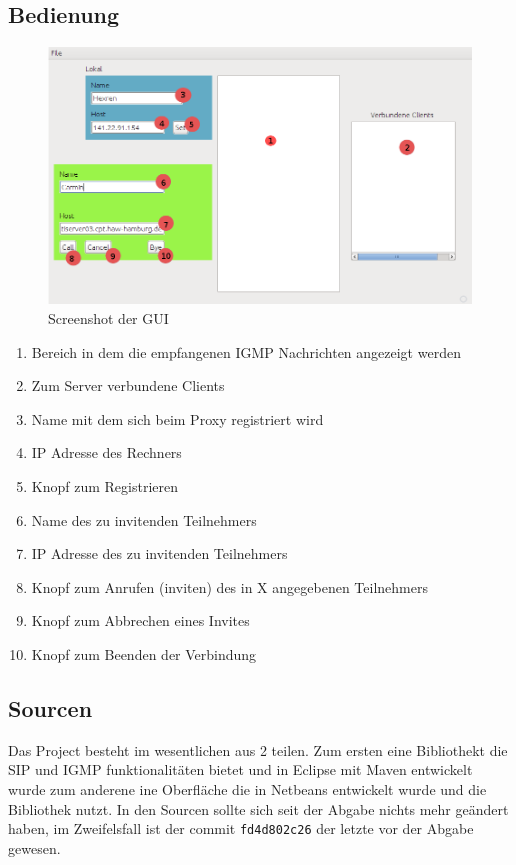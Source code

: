 \documentclass[10pt]{scrartcl}
\begin{document}
\subsection{Bedienung}
\label{sec:bedienung:anwendung}		
	\begin{figure}[H]
        \centering
                \includegraphics[width=\textwidth]{img/screenshotApplication}
        \caption{Screenshot der GUI}
        \label{img:gui}
	\end{figure}

\begin{enumerate}
	\item Bereich in dem die empfangenen IGMP Nachrichten angezeigt werden
	\item Zum Server verbundene Clients
	\item Name mit dem sich beim Proxy registriert wird
	\item IP Adresse des Rechners
	\item Knopf zum Registrieren
	\item Name des zu invitenden Teilnehmers
	\item IP Adresse des zu invitenden Teilnehmers
	\item Knopf zum Anrufen (inviten) des in X angegebenen Teilnehmers
	\item Knopf zum Abbrechen eines Invites
	\item Knopf zum Beenden der Verbindung
\end{enumerate}

\subsection{Sourcen}
Das Project besteht im wesentlichen aus 2 teilen. Zum ersten eine Bibliothekt die SIP und IGMP funktionalitäten bietet und in Eclipse mit Maven entwickelt wurde zum anderene ine Oberfläche die in Netbeans entwickelt wurde und die Bibliothek nutzt. In den Sourcen sollte sich seit der Abgabe nichts mehr geändert haben, im Zweifelsfall ist der commit \verb!fd4d802c26! der letzte vor der Abgabe gewesen.
\end{document}
